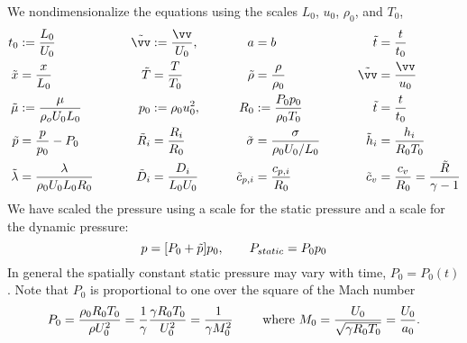 \documentclass{article}
\begin{document}
We nondimensionalize the equations using the scales $L_0$, $u_0$, $\rho_0$, and $T_0$,
\begin{alignat*}{4}
  t_0 &:={L_0 \over U_0} & \qquad \vvt &:={\vv \over U_0}, &
        \qquad    a & = b         &  \qquad \tilde{t} &= {t\over t_0} \\
  \tilde{x} &= {x\over L_0}  &  \qquad  \tilde{T} &= { T \over T_0 } &
       \qquad \tilde{\rho} &= { \rho \over \rho_0 } &    \qquad \tilde{\vv} &= {\vv\over u_0} \\
  \mut &:={\mu \over \rho_o U_0 L_0 } & \qquad p_0 &:=\rho_0 u_0^2, &
        \qquad R_0 & := {P_0 p_0\over \rho_0 T_0} &  \qquad \tilde{t} &= {t\over t_0} \\
  \tilde{p} &= {p \over p_0} - P_0 &   \qquad \Rt_i&= { R_i \over R_0}   &
        \qquad\tilde{\sigma} &= {\sigma \over {\rho_0 U_0/ L_0}} &  
        \qquad \tilde{h}_i &= { h_i \over R_0 T_0} \\
  \tilde{\lambda} &= {\lambda\over \rho_0 U_0 L_0 R_0} &  \qquad\Dt_i &= { D_i \over L_0 U_0} &
      \qquad \ct_{p,i} &= { c_{p,i} \over R_0} & \qquad \ct_v &= { c_v \over R_0} = {\Rt \over \gamma-1}
\end{alignat*}
We have scaled the pressure using a scale for the static pressure and a scale for the dynamic pressure:
\[
   p = [ P_0 + \tilde{p} ] p_0 , \qquad P_{static} = P_0 p_0
\]
In general the spatially constant static pressure may vary with time,  $P_0=P_0(t)$. Note that $P_0$ is
proportional to one over the square of the Mach number
\[
 P_0 = { \rho_0 R_0 T_0 \over \rho U_0^2 } = {1\over  \gamma } { \gamma R_0 T_0 \over U_0^2 } = {1\over \gamma M_0^2}
  \qquad \mbox{ where } M_0 = {U_0 \over \sqrt{\gamma R_0 T_0}} = {U_0 \over a_0}.
\]
\end{document}
